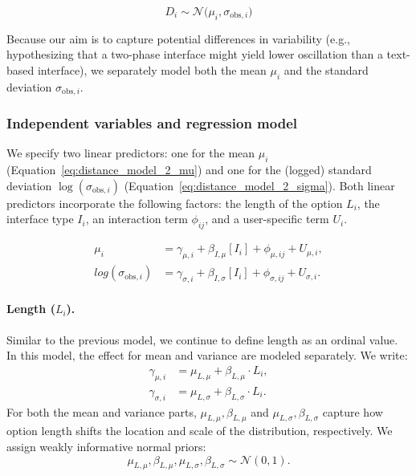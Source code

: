 \begin{equation}\label{eq:distance_model_2_likelihood}
D_i \sim \mathcal{N}\bigl(\mu_i, \sigma_{\text{obs},i}\bigr)
\end{equation}

\noindent Because our aim is to capture potential differences in variability (e.g., hypothesizing that a two-phase interface might yield lower oscillation than a text-based interface), we separately model both the mean $\mu_i$ and the standard deviation $\sigma_{\text{obs},i}$.

\subsubsection{Independent variables and regression model}

We specify two linear predictors: one for the mean $\mu_i$ (Equation~\ref{eq:distance_model_2_mu}) and one for the (logged) standard deviation $\log(\sigma_{\text{obs},i})$ (Equation~\ref{eq:distance_model_2_sigma}). Both linear predictors incorporate the following factors: the length of the option $L_i$, the interface type $I_i$, an interaction term $\phi_{ij}$, and a user-specific term $U_i$.

\begin{align} 
\mu_i &= \gamma_{\mu,i} + \beta_{I,\mu}[I_i] + \phi_{\mu,ij} + U_{\mu,i}, \label{eq:distance_model_2_mu}\\
log(\sigma_{\text{obs},i}) &= \gamma_{\sigma,i} + \beta_{I,\sigma}[I_i] + \phi_{\sigma,ij} + U_{\sigma,i}. \label{eq:distance_model_2_sigma} 
\end{align}

\paragraph{Length ($L_i$).} Similar to the previous model, we continue to define length as an ordinal value. In this model, the effect for mean and variance are modeled separately. We write: 
\begin{align} 
\gamma_{\mu,i} &= \mu_{L,\mu} + \beta_{L,\mu} \cdot L_i, \label{eq:distance_model_2_gamma_mu}\\
\gamma_{\sigma,i} &= \mu_{L,\sigma} + \beta_{L,\sigma} \cdot L_i. \label{eq:distance_model_2_gamma_sigma} 
\end{align}
For both the mean and variance parts, $\mu_{L,\mu}, \beta_{L,\mu}$ and $\mu_{L,\sigma}, \beta_{L,\sigma}$ capture how option length shifts the location and scale of the distribution, respectively. We assign weakly informative normal priors:
\begin{equation}
    \mu_{L,\mu}, \beta_{L,\mu}, \mu_{L,\sigma}, \beta_{L,\sigma} \sim \mathcal{N}(0, 1).
\end{equation}


